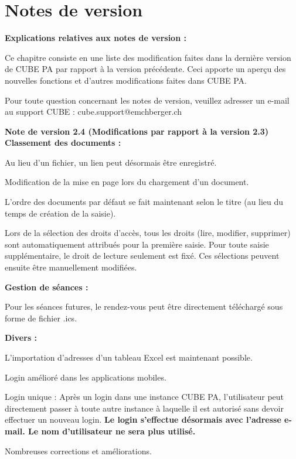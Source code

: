 
\clearpage
\section{Notes de version}

\textbf{Explications relatives aux notes de version :}

\vspace{\baselineskip}

Ce chapitre consiste en une liste des modification faites dans la dernière version de CUBE PA par rapport à la version précédente. Ceci apporte un aperçu des nouvelles fonctions et d'autres modifications faites dans CUBE PA.

\vspace{\baselineskip}

Pour toute question concernant les notes de version, veuillez adresser un e-mail au support CUBE : {\color{red} cube.support@emchberger.ch}

\vspace{\baselineskip}

\textbf{Note de version 2.4 (Modifications par rapport à la version 2.3)} \\

\textbf{Classement des documents :}
\begin{compactitem}
	\item Au lieu d'un fichier, un lien peut désormais être enregistré.
	\item Modification de la mise en page lors du chargement d'un document.
	\item L'ordre des documents par défaut se fait maintenant selon le titre (au lieu du temps de création de la saisie).
	\item Lors de la sélection des droits d'accès, tous les droits (lire, modifier, supprimer) sont automatiquement attribués pour la première saisie. Pour toute saisie supplémentaire, le droit de lecture seulement est fixé. Ces sélections peuvent ensuite être manuellement modifiées.
\end{compactitem}
\textbf{Gestion de séances :}
\begin{compactitem}
	\item Pour les séances futures, le rendez-vous peut être directement téléchargé sous forme de fichier .ics.
\end{compactitem}
\textbf{Divers :}
\begin{compactitem}
	\item L'importation d'adresses d'un tableau Excel est maintenant possible.
	\item Login amélioré dans les applications mobiles.
	\item Login unique : Après un login dans une instance CUBE PA, l'utilisateur peut directement passer à toute autre instance à laquelle il est autorisé sans devoir effectuer un nouveau login. \textbf{Le login s'effectue désormais avec l'adresse e-mail. Le nom d'utilisateur ne sera plus utilisé.}
	\item Nombreuses corrections et améliorations.
\end{compactitem}

